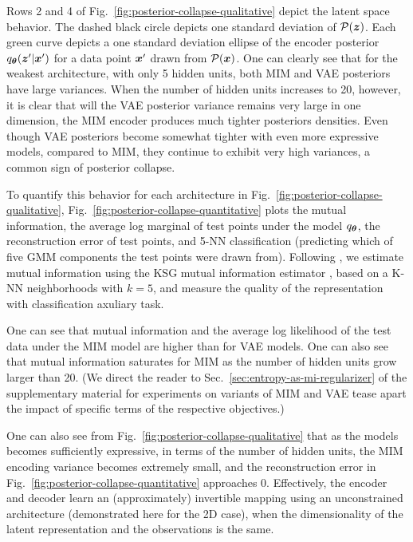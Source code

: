 Rows 2 and 4 of Fig.\ \ref{fig:posterior-collapse-qualitative}
depict the latent space behavior.  The dashed black circle 
depicts one standard deviation of $\mathcal{P}({\boldsymbol z})$. Each green 
curve depicts a one standard deviation ellipse of the encoder posterior  
$q_{{\boldsymbol \theta}}({\boldsymbol z}' | {\boldsymbol{x}}')$ for a data point ${\boldsymbol{x}}'$ drawn from $\mathcal{P}({\boldsymbol{x}})$.
One can clearly see that for the weakest architecture, with only 5 
hidden units, both MIM and VAE posteriors have large variances.
When the number of hidden units increases to 20, however, it is 
clear that will the VAE posterior variance remains very large in
one dimension, the MIM encoder produces much tighter posteriors 
densities.  Even though VAE posteriors become somewhat tighter with even
more expressive models, compared to MIM, they continue to exhibit
very high variances, a common sign of posterior collapse. 



To quantify this behavior for each architecture in  
Fig.\ \ref{fig:posterior-collapse-qualitative}, Fig.\ 
\ref{fig:posterior-collapse-quantitative} plots the mutual information, 
the average log marginal of test points under the model $q_{{\boldsymbol \theta}}$,
the reconstruction error of test points, and 5-NN classification
(predicting which of five GMM components the test points were drawn from).
Following  \cite{Hjelm2018}, we estimate mutual information 
using the KSG mutual information estimator \cite{PhysRevE.69.066138,DBLP:journals/corr/GaoOV16},  
based on a K-NN neighborhoods with $k=5$, and measure the quality of the representation with classification axuliary task.

One can see that mutual information and the average log likelihood 
of the test data under the MIM model are higher than for VAE models.
One can also see that mutual information saturates for MIM as the
number of hidden units grow larger than 20.
(We direct the reader to Sec.\ \ref{sec:entropy-as-mi-regularizer}
of the supplementary material for experiments on variants of 
MIM and VAE tease apart the impact of specific terms of the 
respective objectives.)

One can also see from Fig.\ \ref{fig:posterior-collapse-qualitative} that as the models 
becomes sufficiently expressive, in terms of the number of 
hidden units, the MIM encoding variance becomes extremely small,
and the reconstruction error in Fig.\ \ref{fig:posterior-collapse-quantitative} approaches 0.
Effectively, the encoder and decoder learn an (approximately) invertible mapping using 
an unconstrained architecture (demonstrated here for the 2D case), when the 
dimensionality of the latent representation and the observations is the same.

